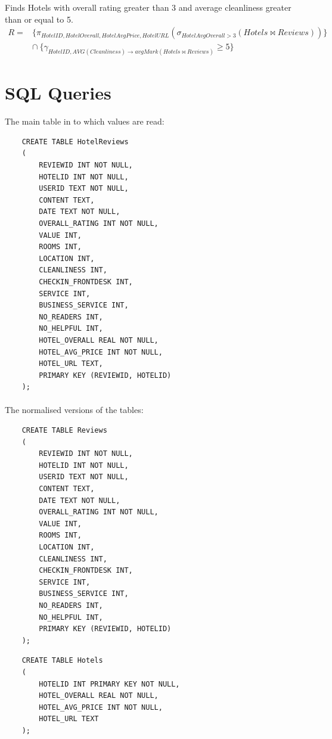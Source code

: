 \documentclass[11pt,epsfig]{article}
\begin{document}
Finds Hotels with overall rating greater than 3 and average cleanliness greater than or equal to 5.
\begin{equation}
\begin{aligned}
	R = {} & \{\pi_{HotelID, HotelOverall, HotelAvgPrice, HotelURL}(\sigma_{HotelAvgOverall > 3}(Hotels \bowtie Reviews))\} \\
		   & \cap\ \{\gamma_{HotelID,AVG(Cleanliness) \rightarrow avgMark(Hotels \bowtie Reviews)} \geq 5\}
\end{aligned}
\end{equation}

\section{SQL Queries}

The main table in to which values are read:
\begin{verbatim}
	CREATE TABLE HotelReviews 
	(
		REVIEWID INT NOT NULL,
		HOTELID INT NOT NULL,
		USERID TEXT NOT NULL,
		CONTENT TEXT,
		DATE TEXT NOT NULL,
		OVERALL_RATING INT NOT NULL,
		VALUE INT,
		ROOMS INT,
		LOCATION INT,
		CLEANLINESS INT,
		CHECKIN_FRONTDESK INT,
		SERVICE INT,
		BUSINESS_SERVICE INT,
		NO_READERS INT,
		NO_HELPFUL INT,
		HOTEL_OVERALL REAL NOT NULL,
		HOTEL_AVG_PRICE INT NOT NULL,
		HOTEL_URL TEXT,
		PRIMARY KEY (REVIEWID, HOTELID)		
	);
\end{verbatim}
\paragraph{}
The normalised versions of the tables:
\begin{verbatim}
	CREATE TABLE Reviews 
	(
		REVIEWID INT NOT NULL,
		HOTELID INT NOT NULL,
		USERID TEXT NOT NULL,
		CONTENT TEXT,
		DATE TEXT NOT NULL,
		OVERALL_RATING INT NOT NULL,
		VALUE INT,
		ROOMS INT,
		LOCATION INT,
		CLEANLINESS INT,
		CHECKIN_FRONTDESK INT,
		SERVICE INT,
		BUSINESS_SERVICE INT,
		NO_READERS INT,
		NO_HELPFUL INT,
		PRIMARY KEY (REVIEWID, HOTELID)		
	);
\end{verbatim}
\begin{verbatim}
	CREATE TABLE Hotels
	(
		HOTELID INT PRIMARY KEY NOT NULL,
		HOTEL_OVERALL REAL NOT NULL,
		HOTEL_AVG_PRICE INT NOT NULL,
		HOTEL_URL TEXT
	);
\end{verbatim}
\end{document}
